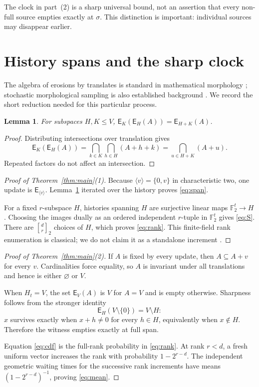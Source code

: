 \documentclass[a4paper,10pt]{amsart}
\newtheorem{lemma}[theorem]{Lemma}
\newcommand{\F}{\mathbb F}
\newcommand{\E}{\mathsf E}
\begin{document}
The clock in part~(2) is a sharp universal bound, not an assertion that every
non-full source empties exactly at $\sigma$.  This distinction is important:
individual sources may disappear earlier.

\section{History spans and the sharp clock}

The algebra of erosions by translates is standard in mathematical morphology
\citep{heijmans_ronse_1990,heijmans_serra_1992}; stochastic morphological
sampling is also established background \citep{sivakumar_goutsias_1996}.
We record the short reduction needed for this particular process.

\begin{lemma}\label{lem:semigroup}
For subspaces $H,K\leq V$,
$\E_K(\E_H(A))=\E_{H+K}(A)$.
\end{lemma}

\begin{proof}
Distributing intersections over translation gives
\[
 \E_K(\E_H(A))
 =\bigcap_{k\in K}\bigcap_{h\in H}(A+h+k)
 =\bigcap_{u\in H+K}(A+u).
\]
Repeated factors do not affect an intersection.
\end{proof}

\begin{proof}[Proof of Theorem~\ref{thm:main}(1)]
Because $\langle v\rangle=\{0,v\}$ in characteristic two, one update is
$\E_{\langle v\rangle}$.  Lemma~\ref{lem:semigroup} iterated over the history
proves \eqref{eq:span}.

For a fixed $r$-subspace $H$, histories spanning $H$ are surjective linear
maps $\F_2^t\to H$.  Choosing the images dually as an ordered independent
$r$-tuple in $\F_2^t$ gives \eqref{eq:S}.  There are
$\genfrac{[}{]}{0pt}{}{d}{r}_2$ choices of $H$, which proves
\eqref{eq:rank}.  This finite-field rank enumeration is classical; we do not
claim it as a standalone increment \citep{balakin_1968}.
\end{proof}

\begin{proof}[Proof of Theorem~\ref{thm:main}(2)]
If $A$ is fixed by every update, then $A\subseteq A+v$ for every $v$.
Cardinalities force equality, so $A$ is invariant under all translations and
hence is either $\varnothing$ or $V$.

When $H_t=V$, the set $\E_V(A)$ is $V$ for $A=V$ and is empty otherwise.
Sharpness follows from the stronger identity
\begin{equation}\label{eq:witness}
 \E_H(V\setminus\{0\})=V\setminus H:
\end{equation}
$x$ survives exactly when $x+h\neq0$ for every $h\in H$, equivalently when
$x\notin H$.  Therefore the witness empties exactly at full span.

Equation \eqref{eq:cdf} is the full-rank probability in \eqref{eq:rank}.
At rank $r<d$, a fresh uniform vector increases the rank with probability
$1-2^{r-d}$.  The independent geometric waiting times for the successive
rank increments have means $(1-2^{r-d})^{-1}$, proving \eqref{eq:mean}.
\end{proof}
\end{document}

